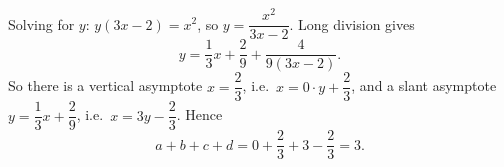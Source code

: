 Solving for $y$: $y(3x-2)=x^2$, so $y=\dfrac{x^2}{3x-2}$. Long division gives
\[
y=\dfrac{1}{3}x+\dfrac{2}{9}+\dfrac{4}{9(3x-2)} .
\]
So there is a vertical asymptote $x=\dfrac{2}{3}$, i.e.\ $x=0\cdot y+\dfrac{2}{3}$, and a slant asymptote $y=\dfrac{1}{3}x+\dfrac{2}{9}$, i.e.\ $x=3y-\dfrac{2}{3}$. Hence
\[
a+b+c+d=0+\dfrac{2}{3}+3-\dfrac{2}{3}=\boxed{3}.
\]
